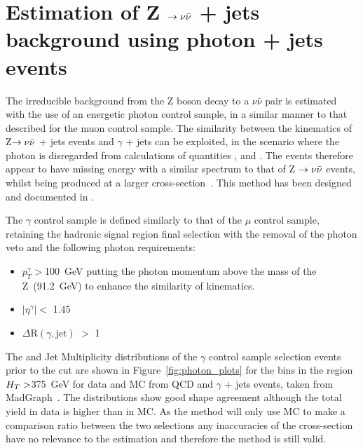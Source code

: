 
\section{Estimation of Z $\rightarrow \nu \bar{\nu}$ + jets background using photon + jets events}

The irreducible background from the Z boson decay to a $\nu \bar{\nu}$ pair is estimated with the use of an energetic photon control sample, in a similar manner to that described for the muon control sample. The similarity between the kinematics of Z$ \rightarrow \nu \bar{\nu}$ + jets events and $\gamma$ + jets can be exploited, in the scenario where the photon is disregarded from calculations of quantities \HT, \MHT and \alt. The events therefore appear to have missing energy with a similar spectrum to that of Z $\rightarrow \nu \bar{\nu}$ events, whilst being produced at a larger cross-section~\cite{gamjetNLO}. This method has been designed and documented in \cite{SUS-10-001}.

The $\gamma$ control sample is defined similarly to that of the $\mu$ control sample, retaining the hadronic signal region final selection with the removal of the photon veto and the following photon requirements:

\begin{itemize}
\item $p^{\gamma}_{T} > $100~GeV putting the photon momentum above the mass of the Z~(91.2~GeV) to enhance the similarity of kinematics.
\item $| \eta^{\gamma}| <$ 1.45
\item $\Delta \textrm{R}(\gamma, \textrm{jet})$ $>$ 1
\end{itemize}

The \alt and Jet Multiplicity distributions of the $\gamma$ control sample selection events prior to the \alt cut are shown in Figure~\ref{fig:photon_plots} for the bins in the region $H_{T} > $375~GeV for data and MC from QCD and $\gamma$ + jets events, taken from MadGraph~\cite{madgraph}. The distributions show good shape agreement although the total yield in data is higher than in MC. As the method will only use MC to make a comparison ratio between the two selections any inaccuracies of the cross-section have no relevance to the estimation and therefore the method is still valid.



